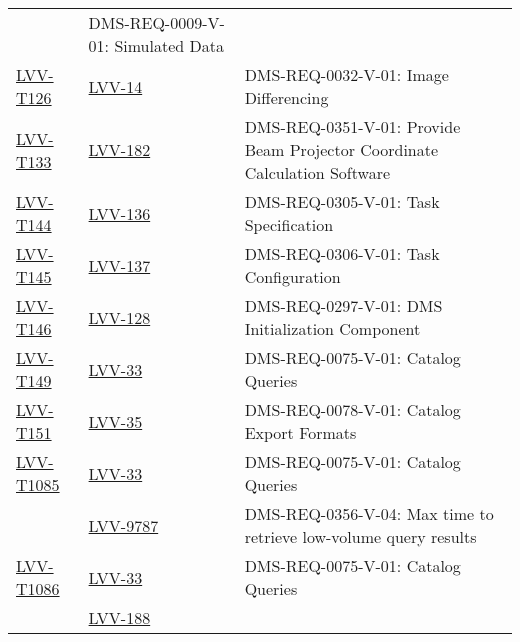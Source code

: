\begin{longtable}{p{3cm}p{3cm}L{9cm}}
  & DMS-REQ-0009-V-01: Simulated Data
 \\ 
\hline
\href{https://jira.lsstcorp.org/secure/Tests.jspa#/testCase/LVV-T126}{LVV-T126} &
  \href{https://jira.lsstcorp.org/browse/LVV-14}{LVV-14}
  & DMS-REQ-0032-V-01: Image Differencing
 \\ 
\hline
\href{https://jira.lsstcorp.org/secure/Tests.jspa#/testCase/LVV-T133}{LVV-T133} &
  \href{https://jira.lsstcorp.org/browse/LVV-182}{LVV-182}
  & DMS-REQ-0351-V-01: Provide Beam Projector Coordinate Calculation
Software
 \\ 
\hline
\href{https://jira.lsstcorp.org/secure/Tests.jspa#/testCase/LVV-T144}{LVV-T144} &
  \href{https://jira.lsstcorp.org/browse/LVV-136}{LVV-136}
  & DMS-REQ-0305-V-01: Task Specification
 \\ 
\hline
\href{https://jira.lsstcorp.org/secure/Tests.jspa#/testCase/LVV-T145}{LVV-T145} &
  \href{https://jira.lsstcorp.org/browse/LVV-137}{LVV-137}
  & DMS-REQ-0306-V-01: Task Configuration
 \\ 
\hline
\href{https://jira.lsstcorp.org/secure/Tests.jspa#/testCase/LVV-T146}{LVV-T146} &
  \href{https://jira.lsstcorp.org/browse/LVV-128}{LVV-128}
  & DMS-REQ-0297-V-01: DMS Initialization Component
 \\ 
\hline
\href{https://jira.lsstcorp.org/secure/Tests.jspa#/testCase/LVV-T149}{LVV-T149} &
  \href{https://jira.lsstcorp.org/browse/LVV-33}{LVV-33}
  & DMS-REQ-0075-V-01: Catalog Queries
 \\ 
\hline
\href{https://jira.lsstcorp.org/secure/Tests.jspa#/testCase/LVV-T151}{LVV-T151} &
  \href{https://jira.lsstcorp.org/browse/LVV-35}{LVV-35}
  & DMS-REQ-0078-V-01: Catalog Export Formats
 \\ 
\hline
\href{https://jira.lsstcorp.org/secure/Tests.jspa#/testCase/LVV-T1085}{LVV-T1085} &
  \href{https://jira.lsstcorp.org/browse/LVV-33}{LVV-33}
  & DMS-REQ-0075-V-01: Catalog Queries
 \\ 
 &   \href{https://jira.lsstcorp.org/browse/LVV-9787}{LVV-9787}
  & DMS-REQ-0356-V-04: Max time to retrieve low-volume query results
 \\ 
\hline
\href{https://jira.lsstcorp.org/secure/Tests.jspa#/testCase/LVV-T1086}{LVV-T1086} &
  \href{https://jira.lsstcorp.org/browse/LVV-33}{LVV-33}
  & DMS-REQ-0075-V-01: Catalog Queries
 \\ 
 &   \href{https://jira.lsstcorp.org/browse/LVV-188}{LVV-188}

\end{longtable}
